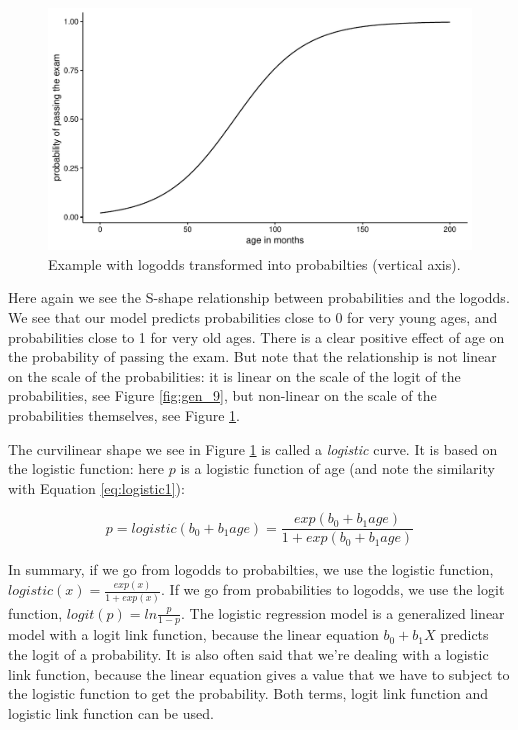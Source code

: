 \documentclass[]{book}\usepackage[]{graphicx}\usepackage[]{color}
\makeatletter
\def\maxwidth{ %
  \ifdim\Gin@nat@width>\linewidth
    \linewidth
  \else
    \Gin@nat@width
  \fi
}
\newenvironment{knitrout}{}{} %
\makeatother
\begin{document}
\begin{knitrout}
\color{fgcolor}\begin{figure}

{\centering \includegraphics[width=\maxwidth]{figure/gen_10-1} 

}

\caption[Example with logodds transformed into probabilties (vertical axis)]{Example with logodds transformed into probabilties (vertical axis).}\label{fig:gen_10}
\end{figure}


\end{knitrout}

Here again we see the S-shape relationship between probabilities and the logodds. We see that our model predicts probabilities close to 0 for very young ages, and probabilities close to 1 for very old ages. There is a clear positive effect of age on the probability of passing the exam. But note that the relationship is not linear on the scale of the probabilities: it is linear on the scale of the logit of the probabilities, see Figure \ref{fig:gen_9}, but non-linear on the scale of the probabilities themselves, see Figure \ref{fig:gen_10}.

The curvilinear shape we see in Figure \ref{fig:gen_10} is called a \textit{logistic} curve. It is based on the logistic function: here $p$ is a logistic function of age (and note the similarity with Equation \ref{eq:logistic1}):


\begin{equation}
p = logistic(b_0 + b_1 age) = \frac{exp(b_0 + b_1 age)}{1+exp(b_0+ b_1 age)} \nonumber
\end{equation}

In summary, if we go from logodds to probabilties, we use the logistic function, $logistic(x)=\frac{exp(x)}{1+exp(x)}$. If we go from probabilities to logodds, we use the logit function, $logit(p)=ln\frac{p}{1-p}$. The logistic regression model is a generalized linear model with a logit link function, because the linear equation $b_0 + b_1 X$ predicts the logit of a probability. It is also often said that we're dealing with a logistic link function, because the linear equation gives a value that we have to subject to the logistic function to get the probability. Both terms, logit link function and logistic link function can be used.
\end{document}

